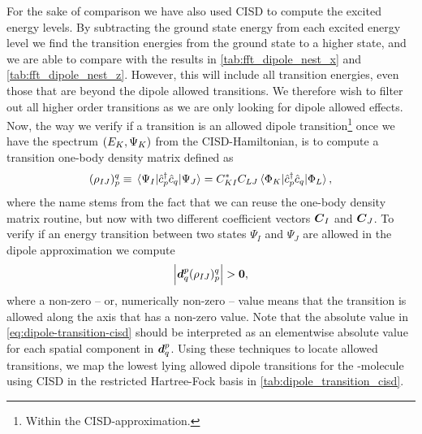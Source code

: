         For the sake of comparison we have also used CISD to compute the excited
        energy levels.
        By subtracting the ground state energy from each excited energy level we
        find the transition energies from the ground state to a higher state,
        and we are able to compare with the results in
        \autoref{tab:fft_dipole_nest_x} and \autoref{tab:fft_dipole_nest_z}.
        However, this will include all transition energies, even those that are
        beyond the dipole allowed transitions.
        We therefore wish to filter out all higher order transitions as we are
        only looking for dipole allowed effects.
        Now, the way we verify if a transition is an allowed dipole
        transition\footnote{%
            Within the CISD-approximation.
        }
        once we have the spectrum $(E_K, \Psi_K)$ from the
        CISD-Hamiltonian, is to compute a transition one-body density matrix
        defined as
        \begin{align}
            (\rho_{IJ})^{q}_{p}
            \equiv \mel*{\Psi_I}{
                \hat{c}_{p}^{\dagger}
                \hat{c}_{q}
            }{\Psi_J}
            = C^{*}_{KI} C_{LJ}
            \mel*{\Phi_{K}}{
                \hat{c}_{p}^{\dagger}
                \hat{c}_{q}
            }{\Phi_L},
        \end{align}
        where the name stems from the fact that we can reuse the one-body
        density matrix routine, but now with two different coefficient vectors
        $\boldsymbol{C}_I$ and $\boldsymbol{C}_J$.
        To verify if an energy transition between two states $\Psi_I$ and
        $\Psi_J$ are allowed in the dipole approximation we compute
        \begin{align}
            \abs{\boldsymbol{d}^{p}_{q} (\rho_{IJ})^{q}_{p}}
            > \boldsymbol{0},
            \label{eq:dipole-transition-cisd}
        \end{align}
        where a non-zero -- or, numerically non-zero -- value means that the
        transition is allowed along the axis that has a non-zero value.
        Note that the absolute value in \autoref{eq:dipole-transition-cisd}
        should be interpreted as an elementwise absolute value for each spatial
        component in $\boldsymbol{d}^{p}_{q}$.
        Using these techniques to locate allowed transitions, we map the
        lowest lying allowed dipole transitions for the -molecule using
        CISD in the restricted Hartree-Fock basis in
        \autoref{tab:dipole_transition_cisd}.
